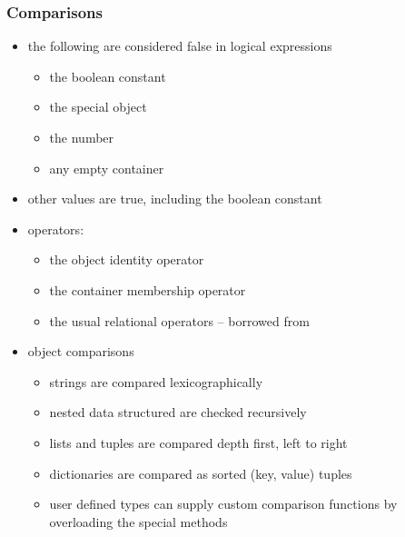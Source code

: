\begin{frame}[fragile]
%
  \frametitle{Comparisons}
%
  \begin{itemize}
%
  \item the following are considered false in logical expressions
    \begin{itemize}
    \item the boolean constant 
    \item the special object 
    \item the number 
    \item any empty container
    \end{itemize}
%
  \item other values are true, including the boolean constant 
%
  \item operators:
    \begin{itemize}
    \item the object identity operator 
    \item the container membership operator 
    \item the usual relational operators -- borrowed from \cc
    \end{itemize}
%
  \item object comparisons
    \begin{itemize}
    \item strings are compared lexicographically
    \item nested data structured are checked recursively
    \item lists and tuples are compared depth first, left to right
    \item dictionaries are compared as sorted (key, value) tuples
    \item user defined types can supply custom comparison functions by overloading the special
      methods
    \end{itemize}
%
  \end{itemize}
%
\end{frame}

